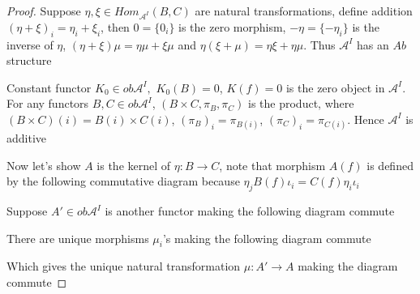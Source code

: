 \documentclass[../main.tex]{subfiles}
\begin{document}
\begin{proof}
Suppose $\eta,\xi\in Hom_{\mathcal A^I}(B,C)$ are natural transformations, define addition $(\eta+\xi)_i=\eta_i+\xi_i$, then $0=\{0_i\}$ is the zero morphism, $-\eta=\{-\eta_i\}$ is the inverse of $\eta$, $(\eta+\xi)\mu=\eta\mu+\xi\mu$ and $\eta(\xi+\mu)=\eta\xi+\eta\mu$. Thus $\mathcal A^I$ has an $Ab$ structure \par
Constant functor $K_0\in ob\mathcal A^I, $ $K_0(B)=0$, $K(f)=0$ is the zero object in $\mathcal A^I$. For any functors $B,C\in ob\mathcal A^I$, $(B\times C,\pi_B,\pi_C)$ is the product, where $(B\times C)(i)=B(i)\times C(i)$, $(\pi_B)_i=\pi_{B(i)}$, $(\pi_C)_i=\pi_{C(i)}$. Hence $\mathcal A^I$ is additive \par
Now let's show $A$ is the kernel of $\eta:B\to C$, note that morphism $A(f)$ is defined by the following  commutative diagram because $\eta_jB(f)\iota_i=C(f)\eta_i\iota_i$ \par
\begin{center}
\end{center}
Suppose $A'\in ob\mathcal A^I$ is another functor making the following diagram commute
\begin{center}
\end{center}
There are unique morphisms $\mu_i$'s making the following diagram commute
\begin{center}
\end{center}
Which gives the unique natural transformation $\mu:A'\to A$ making the diagram commute

\end{proof}
\end{document}
